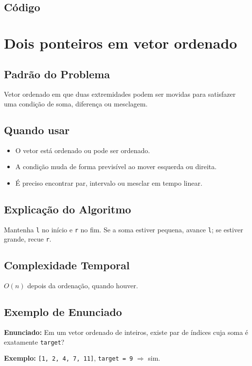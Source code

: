 \subsection{Código}

\section{Dois ponteiros em vetor ordenado}

\subsection{Padrão do Problema}
Vetor ordenado em que duas extremidades podem ser movidas para satisfazer uma condição de soma, diferença ou mesclagem.

\subsection{Quando usar}
\begin{itemize}[nosep]
  \item O vetor está ordenado ou pode ser ordenado.
  \item A condição muda de forma previsível ao mover esquerda ou direita.
  \item É preciso encontrar par, intervalo ou mesclar em tempo linear.
\end{itemize}

\subsection{Explicação do Algoritmo}
Mantenha \texttt{l} no início e \texttt{r} no fim. Se a soma estiver pequena, avance \texttt{l}; se estiver grande, recue \texttt{r}.

\subsection{Complexidade Temporal}
$O(n)$ depois da ordenação, quando houver.

\subsection{Exemplo de Enunciado}
\begin{exemplodiabox}
\textbf{Enunciado:} Em um vetor ordenado de inteiros, existe par de índices cuja soma é exatamente \texttt{target}?

\textbf{Exemplo:} \texttt{[1, 2, 4, 7, 11]}, \texttt{target = 9} $\Rightarrow$ sim.
\end{exemplodiabox}

